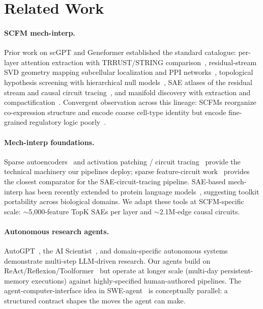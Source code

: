 \documentclass{article}
\newcommand{\scfm}{SCFM\xspace}
\begin{document}
\section{Related Work}

\paragraph{\scfm{} mech-interp.} Prior work on scGPT and Geneformer
established the standard catalogue: per-layer attention extraction
with TRRUST/STRING comparison~\citep{anon2026attention},
residual-stream SVD geometry mapping subcellular localization and PPI
networks~\citep{anon2026spectral}, topological hypothesis
screening with hierarchical null
models~\citep{anon2026topology}, SAE atlases of the residual
stream and causal circuit
tracing~\citep{anon2026sae,anon2026circuits}, and manifold
discovery with extraction and
compactification~\citep{anon2026manifold}. Convergent
observation across this lineage: \scfm{}s reorganize co-expression
structure and encode coarse cell-type identity but encode fine-grained
regulatory logic
poorly~\citep{kedzierska2023assessing,liu2023evaluating,wenteler2024perteval}.

\paragraph{Mech-interp foundations.} Sparse
autoencoders~\citep{bricken2023monosemanticity,cunningham2023sparse,templeton2024scaling,gao2024scalingsae}
and activation patching / circuit
tracing~\citep{conmy2023acdc,wang2023ioi,meng2022rome,olsson2022induction}
provide the technical machinery our pipelines deploy; sparse
feature-circuit work~\citep{marks2024sparsefeaturecircuits,lindsey2024crosscoders}
provides the closest comparator for the SAE-circuit-tracing pipeline.
SAE-based mech-interp has been recently extended to protein language
models~\citep{simon2025interplm}, suggesting toolkit portability
across biological domains. We adapt these tools at \scfm{}-specific
scale: $\sim$5{,}000-feature TopK SAEs per layer and $\sim$2.1M-edge
causal circuits.

\paragraph{Autonomous research agents.}
AutoGPT~\citep{autogpt2023}, the AI
Scientist~\citep{lu2024aiscientist}, and domain-specific autonomous
systems~\citep{boiko2023autonomous,mbran2024chemcrow} demonstrate
multi-step LLM-driven research. Our agents build on
ReAct/Reflexion/Toolformer~\citep{yao2023react,shinn2023reflexion,schick2023toolformer}
but operate at longer scale (multi-day persistent-memory executions)
against highly-specified human-authored pipelines. The
agent-computer-interface idea in
SWE-agent~\citep{yang2024sweagent} is conceptually parallel:
a structured contract shapes the moves the agent can make.
\end{document}

